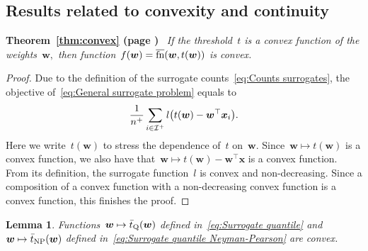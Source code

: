 \documentclass[11pt,a4paper]{article}
\newtheorem{lemma}[thm]{Lemma}
\theoremstyle{definition}
\let\originalleft\left
\let\originalright\right
\renewcommand{\left}{\mathopen{}\mathclose\bgroup\originalleft}
\renewcommand{\right}{\aftergroup\egroup\originalright}
\newcommand{\I}{\mathcal{I}}
\newcommand{\fns}{\overline{\textnormal{fn}}}
\newcommand{\TheoremRef}[2]{\noindent \textbf{Theorem~\ref{#1} (page \pageref{#1})}\ \emph{#2} \\}
\begin{document}
\subsection{Results related to convexity and continuity}


\TheoremRef{thm:convex}{
  If the threshold~$t$ is a convex function of the weights~$\bm{w},$ then function~$f(\bm{w}) = \fns(\bm{w}, t(\bm{w}))$ is convex.
}
\begin{proof}
  Due to the definition of the surrogate counts~\eqref{eq:Counts surrogates}, the objective of~\eqref{eq:General surrogate problem} equals to
  \begin{equation*}
   \frac{1}{n^+}\sum_{i \in \I^+} l\left(t(\bm{w})-\bm{w}^\top \bm{x}_i\right).
  \end{equation*}
  Here we write~$t(\bm{w})$ to stress the dependence of~$t$ on~$\bm{w}.$ Since~$\bm{w} \mapsto t(\bm{w})$ is a convex function, we also have that~$\bm{w} \mapsto t(\bm{w})-\bm{w}^\top \bm{x}$ is a convex function. From its definition, the surrogate function~$l$ is convex and non-decreasing. Since a composition of a convex function with a non-decreasing convex function is a convex function, this finishes the proof.
\end{proof}

\begin{lemma}\label{lemma:Convexity of surrogate quantiles}
  Functions~$\bm{w} \mapsto \bar t_{\rm Q}(\bm{w})$ defined in~\eqref{eq:Surrogate quantile} and~$\bm{w} \mapsto \bar t_{\rm NP}(\bm{w})$ defined in~\eqref{eq:Surrogate quantile Neyman-Pearson} are convex.
\end{lemma}
\end{document}
